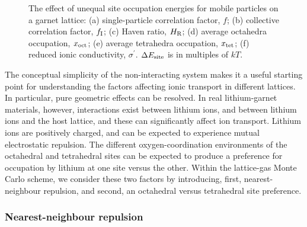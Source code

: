 \documentclass[aps,prb,twocolumn,superscriptaddress,reprint]{revtex4-1}
\begin{document}
\begin{figure}[tb]
  \centering
    \caption{\label{fig:site_energies_data}The effect of unequal site occupation energies for mobile particles on a garnet lattice: (a) single-particle correlation factor, $f$; (b) collective correlation factor, $f_{\mathrm{I}}$; (c) Haven ratio, $H_{\mathrm{R}}$; (d) average octahedra occupation, $x_{\mathrm{oct}}$; (e) average tetrahedra occupation, $x_{\mathrm{tet}}$; (f) reduced ionic conductivity, $\sigma^\prime$. $\Delta E_{\mathrm{site}}$ is in multiples of $kT$.}
\end{figure}

The conceptual simplicity of the non-interacting system makes it a useful starting point for understanding the factors affecting ionic transport in different lattices. In particular, pure geometric effects can be resolved.
In real lithium-garnet materials, however, interactions exist between lithium ions, and between lithium ions and the host lattice, and these can significantly affect ion transport. 
Lithium ions are positively charged, and can be expected to experience mutual electrostatic repulsion. The different oxygen-coordination environments of the octahedral and tetrahedral sites can be expected to produce a preference for occupation by lithium at one site versus the other. 
Within the lattice-gas Monte Carlo scheme, we consider these two factors by introducing, first, nearest-neighbour repulsion, and second, an octahedral versus tetrahedral site preference.

\subsubsection{Nearest-neighbour repulsion}
\end{document}
